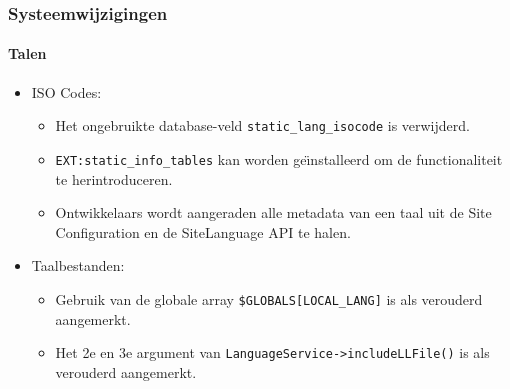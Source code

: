\begin{frame}[fragile]
	\frametitle{Systeemwijzigingen}
	\framesubtitle{Talen}

	\begin{itemize}
		\item ISO Codes:

			\begin{itemize}
				\item Het ongebruikte database-veld \texttt{static\_lang\_isocode} is verwijderd.
				\item \texttt{EXT:static\_info\_tables} kan worden ge\"{\i}nstalleerd om de functionaliteit te herintroduceren.
				\item Ontwikkelaars wordt aangeraden alle metadata van een taal uit de Site Configuration en de SiteLanguage API te halen.
			\end{itemize}

		\item Taalbestanden:

			\begin{itemize}
				\item Gebruik van de globale array \texttt{\$GLOBALS[LOCAL\_LANG]} is als verouderd aangemerkt.
				\item Het 2e en 3e argument van \texttt{LanguageService->includeLLFile()} is als verouderd aangemerkt.
			\end{itemize}

	\end{itemize}

\end{frame}


